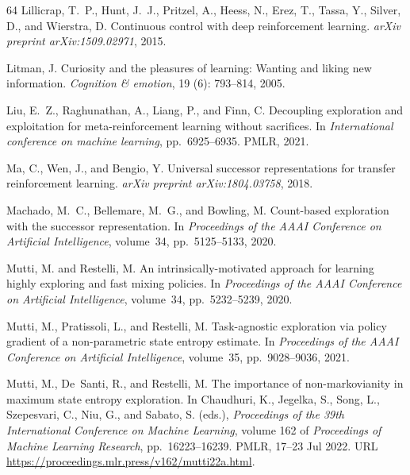 \documentclass{article}
\theoremstyle{plain}
\theoremstyle{definition}
\theoremstyle{remark}
\begin{document}
\begin{thebibliography}{64}
Lillicrap, T.~P., Hunt, J.~J., Pritzel, A., Heess, N., Erez, T., Tassa, Y.,
  Silver, D., and Wierstra, D.
\newblock Continuous control with deep reinforcement learning.
\newblock \emph{arXiv preprint arXiv:1509.02971}, 2015.

Litman, J.
\newblock Curiosity and the pleasures of learning: Wanting and liking new
  information.
\newblock \emph{Cognition \& emotion}, 19 (6): 793--814,
  2005.

Liu, E.~Z., Raghunathan, A., Liang, P., and Finn, C.
\newblock Decoupling exploration and exploitation for meta-reinforcement
  learning without sacrifices.
\newblock In \emph{International conference on machine learning}, pp.\
  6925--6935. PMLR, 2021.

Ma, C., Wen, J., and Bengio, Y.
\newblock Universal successor representations for transfer reinforcement
  learning.
\newblock \emph{arXiv preprint arXiv:1804.03758}, 2018.

Machado, M.~C., Bellemare, M.~G., and Bowling, M.
\newblock Count-based exploration with the successor representation.
\newblock In \emph{Proceedings of the AAAI Conference on Artificial
  Intelligence}, volume~34, pp.\  5125--5133, 2020.

Mutti, M. and Restelli, M.
\newblock An intrinsically-motivated approach for learning highly exploring and
  fast mixing policies.
\newblock In \emph{Proceedings of the AAAI Conference on Artificial
  Intelligence}, volume~34, pp.\  5232--5239, 2020.

Mutti, M., Pratissoli, L., and Restelli, M.
\newblock Task-agnostic exploration via policy gradient of a non-parametric
  state entropy estimate.
\newblock In \emph{Proceedings of the AAAI Conference on Artificial
  Intelligence}, volume~35, pp.\  9028--9036, 2021.

Mutti, M., De~Santi, R., and Restelli, M.
\newblock The importance of non-markovianity in maximum state entropy
  exploration.
\newblock In Chaudhuri, K., Jegelka, S., Song, L., Szepesvari, C., Niu, G., and
  Sabato, S. (eds.), \emph{Proceedings of the 39th International Conference on
  Machine Learning}, volume 162 of \emph{Proceedings of Machine Learning
  Research}, pp.\  16223--16239. PMLR, 17--23 Jul 2022{\natexlab{a}}.
\newblock URL \url{https://proceedings.mlr.press/v162/mutti22a.html}.


\end{thebibliography}
\end{document}
